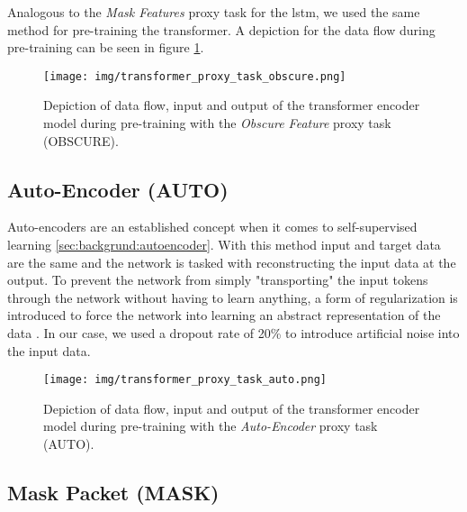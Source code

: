 Analogous to the \textit{Mask Features} proxy task for the \gls{lstm}, we used the same method for pre-training the transformer. A depiction for the data flow during pre-training can be seen in figure \ref{fig:experiments:transformer:obscure}.

\begin{figure}[]
	\centering
	\texttt{[image: img/transformer\_proxy\_task\_obscure.png]}
	\caption{Depiction of data flow, input and output of the transformer encoder model during pre-training with the \textit{Obscure Feature} proxy task (OBSCURE). }
	\label{fig:experiments:transformer:obscure}
\end{figure}

\clearpage

\subsection{Auto-Encoder (AUTO)} \label{sec:experiments:transformer:auto_encoder}

Auto-encoders are an established concept when it comes to self-supervised learning \ref{sec:backgrund:autoencoder}. With this method input and target data are the same and the network is tasked with reconstructing the input data at the output. To prevent the network from simply "transporting" the input tokens through the network without having to learn anything, a form of regularization is introduced to force the network into learning an abstract representation of the data \cite{autoencoders}. In our case, we used a dropout rate of 20\% to introduce artificial noise into the input data. 

\begin{figure}[h]
	\centering
	\texttt{[image: img/transformer\_proxy\_task\_auto.png]}
	\caption{Depiction of data flow, input and output of the transformer encoder model during pre-training with the \textit{Auto-Encoder} proxy task (AUTO). }
	\label{fig:experiments:transformer:auto}
\end{figure}

\subsection{Mask Packet (MASK)} \label{sec:experiments:transformer:mask_packet}


